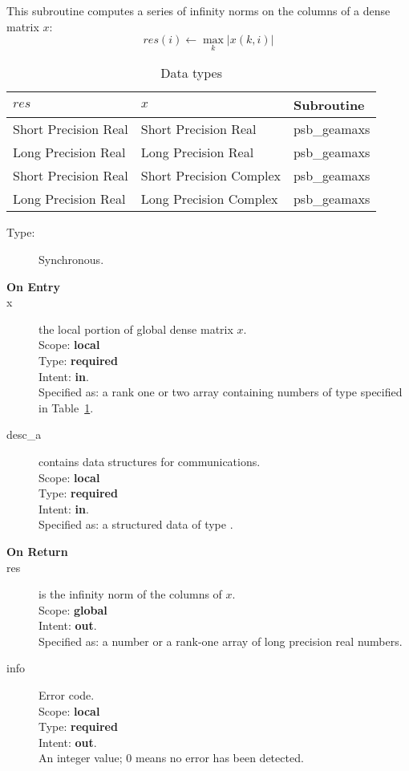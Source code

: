 This subroutine computes a series of  infinity norms on the columns of
a  dense matrix  $x$: 
\[ res(i) \leftarrow \max_k |x(k,i)| \]

\begin{table}[h]
\begin{center}
\begin{tabular}{lll}
\hline
$res$&  $x$& {\bf Subroutine}\\
\hline
Short Precision Real    &Short Precision Real    & psb\_geamaxs\\
Long Precision Real    &Long Precision Real    & psb\_geamaxs\\
Short Precision Real &Short Precision Complex & psb\_geamaxs\\	
Long Precision Real &Long Precision Complex & psb\_geamaxs\\	
\hline
\end{tabular}
\end{center}
\caption{Data types\label{tab:f90mamax}}
\end{table}

\begin{description}
\item[Type:] Synchronous.
\item[\bf On Entry]
\item[x] the local portion of global dense matrix
$x$. \\
Scope: {\bf local} \\
Type: {\bf required} \\
Intent: {\bf in}.\\
Specified as: a rank one or two array 
containing numbers of type specified in
Table~\ref{tab:f90mamax}. 
\item[desc\_a] contains data structures for communications.\\
Scope: {\bf local} \\
Type: {\bf required}\\
Intent: {\bf in}.\\
Specified as: a structured data of type \descdata.
\item[\bf On Return] 
\item[res] is the infinity norm of the columns of $x$.\\
Scope: {\bf global} \\
Intent: {\bf out}.\\
Specified as: a number or a rank-one array  of long precision real numbers. 
\item[info] Error code.\\
Scope: {\bf local} \\
Type: {\bf required} \\
Intent: {\bf out}.\\
An integer value; 0 means no error has been detected. 
\end{description}

